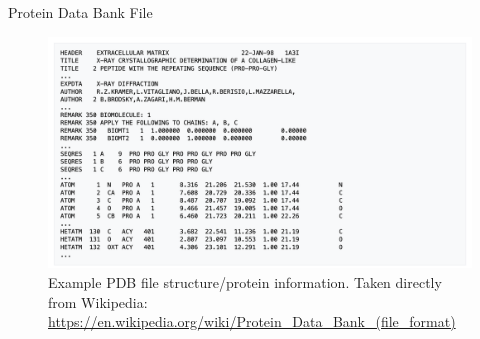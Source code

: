 \documentclass{beamer}
\begin{document}
\begin{frame}{Protein Data Bank File}
    \begin{figure}
        \centering
        \includegraphics[scale=0.37]{PDB_File_Ex.png}
        \caption{Example PDB file structure/protein information. Taken directly from Wikipedia: \url{https://en.wikipedia.org/wiki/Protein_Data_Bank_(file_format)}
        }
    \end{figure}
\end{frame}
\end{document}
